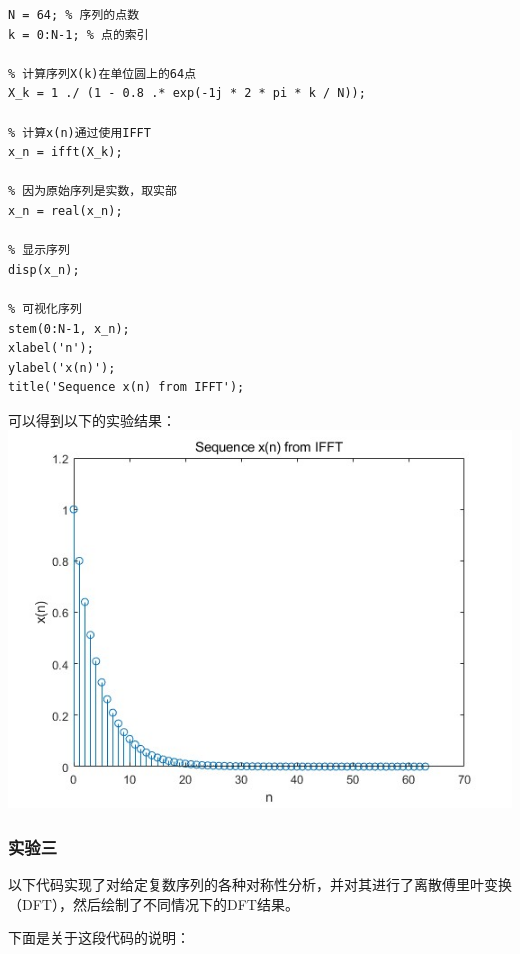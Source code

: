 \documentclass[a4paper,12pt]{article}
\begin{document}
\begin{lstlisting}
N = 64; % 序列的点数
k = 0:N-1; % 点的索引

% 计算序列X(k)在单位圆上的64点
X_k = 1 ./ (1 - 0.8 .* exp(-1j * 2 * pi * k / N));

% 计算x(n)通过使用IFFT
x_n = ifft(X_k);

% 因为原始序列是实数，取实部
x_n = real(x_n);

% 显示序列
disp(x_n);

% 可视化序列
stem(0:N-1, x_n);
xlabel('n');
ylabel('x(n)');
title('Sequence x(n) from IFFT');

\end{lstlisting}

可以得到以下的实验结果：
\centering 
\includegraphics[width=0.8\linewidth]{images/2_Verify/verify2.jpg}
\justifying

\subsubsection{实验三}
以下代码实现了对给定复数序列的各种对称性分析，并对其进行了离散傅里叶变换（DFT），然后绘制了不同情况下的DFT结果。

下面是关于这段代码的说明：
\end{document}
